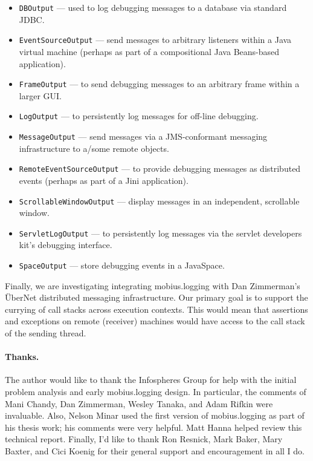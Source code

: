 \documentclass{article}
\begin{document}
\begin{itemize}
\item \texttt{DBOutput} --- used to log debugging messages to a
  database via standard JDBC.
\item \texttt{EventSourceOutput} --- send messages to arbitrary
  listeners within a Java virtual machine (perhaps as part of a
  compositional Java Beans-based application).
\item \texttt{FrameOutput} --- to send debugging messages to an
  arbitrary frame within a larger GUI.
\item \texttt{LogOutput} --- to persistently log messages for
  off-line debugging.
\item \texttt{MessageOutput} --- send messages via a
  JMS-conformant messaging infrastructure to a/some remote objects.
\item \texttt{RemoteEventSourceOutput} --- to provide debugging
  messages as distributed events (perhaps as part of a
  Jini\cite{JiniArchOverview98} application).
\item \texttt{ScrollableWindowOutput} --- display messages in an
  independent, scrollable window.
\item \texttt{ServletLogOutput} --- to persistently log messages via
  the servlet developers kit's debugging interface.
\item \texttt{SpaceOutput} --- store debugging events in a
  JavaSpace\cite{JavaSpaces98}.
\end{itemize}

Finally, we are investigating integrating mobius.logging with Dan Zimmerman's
\"UberNet distributed messaging infrastructure\cite{Zimmerman98}. Our
primary goal is to support the currying of call stacks across
execution contexts.  This would mean that assertions and exceptions on
remote (receiver) machines would have access to the call stack of the
sending thread.

\paragraph{Thanks.}
The author would like to thank the Infospheres Group for help with the
initial problem analysis and early mobius.logging design.  In particular, the
comments of Mani Chandy, Dan Zimmerman, Wesley Tanaka, and Adam Rifkin
were invaluable.  Also, Nelson Minar used the first version of mobius.logging
as part of his thesis work; his comments were very helpful.  Matt
Hanna helped review this technical report.  Finally, I'd like to thank
Ron Resnick, Mark Baker, Mary Baxter, and Cici Koenig for their
general support and encouragement in all I do.





\end{document}
